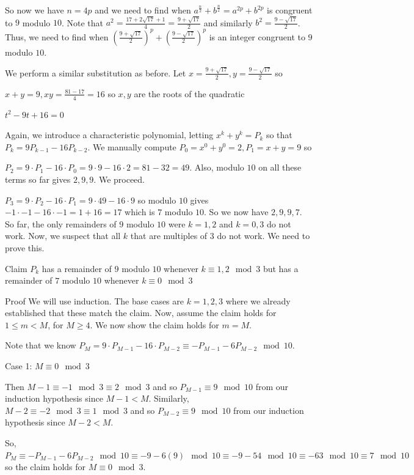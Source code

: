 \begin{enumerate}
 So now we have $n = 4p$ and we need to find when $a^{\frac{n}{2}} + b^{\frac{n}{2}} = a^{2p} + b^{2p}$ is congruent to $9$ modulo $10$. Note that $a^2 = \frac{17 + 2\sqrt{17} + 1}{4} = \frac{9 + \sqrt{17}}{2}$ and similarly $b^2 = \frac{9 - \sqrt{17}}{2}$. Thus, we need to find when $(\frac{9 + \sqrt{17}}{2})^p + (\frac{9 - \sqrt{17}}{2})^p$ is an integer congruent to $9$ modulo $10$.

 We perform a similar substitution as before. Let $x = \frac{9 + \sqrt{17}}{2}, y = \frac{9 - \sqrt{17}}{2}$ so

 $x + y = 9, xy = \frac{81 - 17}{4} = 16$ so $x, y$ are the roots of the quadratic

 $t^2 - 9t + 16 = 0$

 Again, we introduce a characteristic polynomial, letting $x^k + y^k = P_k$ so that $P_k = 9 P_{k - 1} - 16 P_{k - 2}$. We manually compute $P_0 = x^0 + y^0 = 2, P_1 = x + y = 9$ so

 $P_2 = 9 \cdot P_1 - 16 \cdot P_0 = 9 \cdot 9 - 16 \cdot 2 = 81 - 32 = 49$. Also, modulo $10$ on all these terms so far gives $2, 9, 9$. We proceed.

 $P_3 = 9 \cdot P_2 - 16 \cdot P_1 = 9 \cdot 49 - 16 \cdot 9$ so modulo $10$ gives $-1 \cdot -1 - 16 \cdot -1 = 1 + 16 = 17$ which is $7$ modulo $10$. So we now have $2, 9, 9, 7$. So far, the only remainders of $9$ modulo $10$ were $k = 1, 2$ and $k = 0, 3$ do not work. Now, we suspect that all $k$ that are multiples of $3$ do not work. We need to prove this.

 Claim $P_{k}$ has a remainder of $9$ modulo $10$ whenever $k \equiv 1, 2 \mod 3$ but has a remainder of $7$ modulo $10$ whenever $k \equiv 0 \mod 3$

 Proof We will use induction. The base cases are $k = 1, 2, 3$ where we already established that these match the claim. Now, assume the claim holds for $1 \leq m < M$, for $M \geq 4$. We now show the claim holds for $m = M$.

 Note that we know $P_M = 9 \cdot P_{M - 1} - 16 \cdot P_{M - 2} \equiv -P_{M - 1} - 6P_{M - 2} \mod 10$.

 Case 1: $M \equiv 0 \mod 3$

 Then $M - 1 \equiv -1 \mod 3 \equiv 2 \mod 3$ and so $P_{M - 1} \equiv 9 \mod 10$ from our induction hypothesis since $M - 1 < M$. Similarly, $M - 2 \equiv -2 \mod 3 \equiv 1 \mod 3$ and so $P_{M - 2} \equiv 9 \mod 10$ from our induction hypothesis since $M - 2 < M$.

 So, $P_M \equiv -P_{M - 1} - 6P_{M - 2} \mod 10 \equiv -9 - 6(9) \mod 10 \equiv -9 - 54 \mod 10 \equiv -63 \mod 10 \equiv 7 \mod 10$ so the claim holds for $M \equiv 0 \mod 3$.


\end{enumerate}
